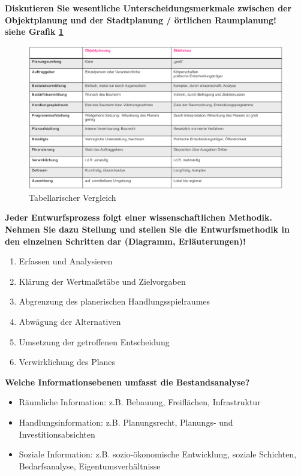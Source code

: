 \documentclass[]{article}
\newenvironment{question}{\vspace{8mm}\noindent\bfseries}{\\}
\begin{document}
\begin{question}
	Diskutieren Sie wesentliche Unterscheidungsmerkmale zwischen der Objektplanung und der Stadtplanung / örtlichen Raumplanung!
\end{question}
siehe Grafik \ref{fig:vergleichstaedtebauobjektplanung}
\begin{figure}[h!]
	\centering
	\includegraphics[width=0.7\linewidth]{images/vergleich_staedtebau_objektplanung}
	\caption{Tabellarischer Vergleich}
	\label{fig:vergleichstaedtebauobjektplanung}
\end{figure}


\begin{question}
	Jeder Entwurfsprozess folgt einer wissenschaftlichen Methodik. Nehmen Sie dazu Stellung und stellen Sie die Entwurfsmethodik in den einzelnen Schritten dar (Diagramm, Erläuterungen)!
\end{question}
\begin{enumerate}
	\item Erfassen und Analysieren
	\item Klärung der Wertmaßstäbe und Zielvorgaben
	\item Abgrenzung des planerischen Handlungsspielraumes
	\item Abwägung der Alternativen
	\item Umsetzung der getroffenen Entscheidung
	\item Verwirklichung des Planes
\end{enumerate}


\begin{question}
	Welche Informationsebenen umfasst die Bestandsanalyse?
\end{question}
\begin{itemize}
	\item Räumliche Information: z.B. Bebauung, Freiflächen, Infrastruktur
	\item Handlungsinformation: z.B. Planungsrecht, Planungs- und Investitionsabsichten
	\item Soziale Information: z.B. sozio-ökonomische Entwicklung, soziale Schichten, Bedarfsanalyse, Eigentumsverhältnisse
\end{itemize}
\end{document}
